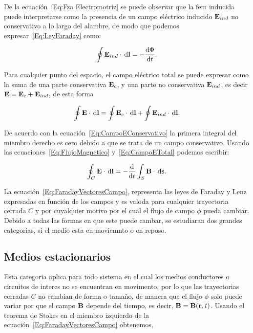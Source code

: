 De la ecuación~\eqref{Eq:Fza Electromotriz} se puede observar que la fem inducida puede interpretarse como la presencia de un campo eléctrico inducido $\textbf{E}_{ind}$ no conservativo a lo largo del alambre, de modo que podemos expresar~\eqref{Eq:LeyFaraday} como:

\begin{equation}
	\label{Eq:CampoETotal}
	\oint \E_{ind} \cdot \dl{\textbf{l}} = -\diff{\Phi}{t}.
\end{equation}

Para cualquier punto del espacio, el campo eléctrico total se puede expresar como la suma de una parte conservativa $\textbf{E}_c$, y una parte no conservativa $\textbf{E}_{ind}$, es decir $\textbf{E}=\textbf{E}_c+\textbf{E}_{ind}$, de esta forma

\begin{equation*}
	\oint \E \cdot \dl{\textbf{l}} = \oint \E_{c} \cdot \dl{\textbf{l}} + \oint \E_{ind} \cdot \dl{\textbf{l}}.
\end{equation*}

De acuerdo con la ecuación~\eqref{Eq:CampoEConservativo} la primera integral del miembro derecho es cero debido a que se trata de un campo conservativo. Usando las ecuaciones~\eqref{Eq:FlujoMagnetico} y~\eqref{Eq:CampoETotal} podemos escribir:

\begin{equation}
	\label{Eq:FaradayVectoresCampo}
	\oint_{C} \E \cdot \dl{\textbf{l}} = -\diff*{ \int_{S} \B \cdot \dl{\textbf{s}} }{t}.
\end{equation}

La ecuación~\eqref{Eq:FaradayVectoresCampo}, representa las leyes de Faraday y Lenz expresadas en función de los campos y es valoda para cualquier trayectoria cerrada $C$ y por cuyalquier motivo por el cual el flujo de campo $\phi$ pueda cambiar. Debido a todas las formas en que este puede cambar, se estudiaran dos grandes categorias, si el medio esta en moviemnto o en reposo.

\subsection{Medios estacionarios}

Esta categoria aplica para todo sistema en el cual los medios conductores o circuitos de interes no se encuentran en movimento, por lo que las trayectorias cerradas $C$ no cambian de forma o tamaño, de manera que el flujo $\phi$ solo puede variar por que el campo $\textbf{B}$ depende del tiempo, es decir, $\textbf{B} = \textbf{B}(\textbf{r}, t)$. Usando el teorema de Stokes en el miembro izquierdo de la ecuación~\eqref{Eq:FaradayVectoresCampo} obtenemos,

